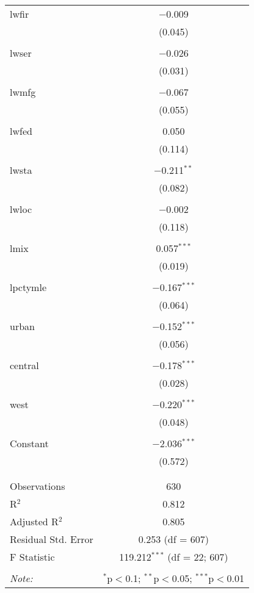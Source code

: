 \begin{table}[!htbp]
\begin{tabular}{@{\extracolsep{5pt}}lc}
 lwfir & $-$0.009 \\ 
  & (0.045) \\ 
  & \\ 
 lwser & $-$0.026 \\ 
  & (0.031) \\ 
  & \\ 
 lwmfg & $-$0.067 \\ 
  & (0.055) \\ 
  & \\ 
 lwfed & 0.050 \\ 
  & (0.114) \\ 
  & \\ 
 lwsta & $-$0.211$^{**}$ \\ 
  & (0.082) \\ 
  & \\ 
 lwloc & $-$0.002 \\ 
  & (0.118) \\ 
  & \\ 
 lmix & 0.057$^{***}$ \\ 
  & (0.019) \\ 
  & \\ 
 lpctymle & $-$0.167$^{***}$ \\ 
  & (0.064) \\ 
  & \\ 
 urban & $-$0.152$^{***}$ \\ 
  & (0.056) \\ 
  & \\ 
 central & $-$0.178$^{***}$ \\ 
  & (0.028) \\ 
  & \\ 
 west & $-$0.220$^{***}$ \\ 
  & (0.048) \\ 
  & \\ 
 Constant & $-$2.036$^{***}$ \\ 
  & (0.572) \\ 
  & \\ 
\hline \\[-1.8ex] 
Observations & 630 \\ 
R$^{2}$ & 0.812 \\ 
Adjusted R$^{2}$ & 0.805 \\ 
Residual Std. Error & 0.253 (df = 607) \\ 
F Statistic & 119.212$^{***}$ (df = 22; 607) \\ 
\hline 
\hline \\[-1.8ex] 
\textit{Note:}  & \multicolumn{1}{r}{$^{*}$p$<$0.1; $^{**}$p$<$0.05; $^{***}$p$<$0.01} \\ 
\end{tabular} 
\end{table} 
